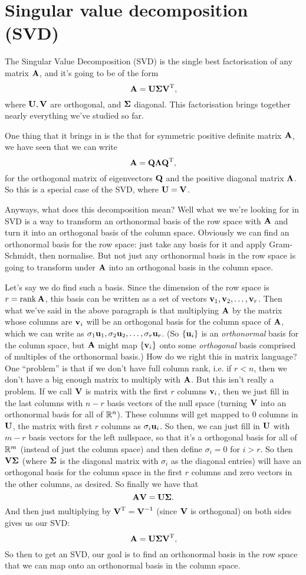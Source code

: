 \section{Singular value decomposition (SVD)}

The Singular Value Decomposition (SVD) is the single best factorisation of any matrix $\boldsymbol{\mathbf{A}}$, and it's going to be of the form
\[ \boldsymbol{\mathbf{A}} = \boldsymbol{\mathbf{U}} \boldsymbol{\mathbf{\Sigma}} \boldsymbol{\mathbf{V}}^\mathrm{T}, \]
where $\boldsymbol{\mathbf{U}},\boldsymbol{\mathbf{V}}$ are orthogonal, and $\boldsymbol{\mathbf{\Sigma}}$ diagonal. This factorisation brings together nearly everything we've studied so far.

One thing that it brings in is the that for symmetric positive definite matrix $\boldsymbol{\mathbf{A}}$, we have seen that we can write
\[ \boldsymbol{\mathbf{A}} = \boldsymbol{\mathbf{Q}} \boldsymbol{\mathbf{\Lambda}} \boldsymbol{\mathbf{Q}}^\mathrm{T}, \]
for the orthogonal matrix of eigenvectors $\boldsymbol{\mathbf{Q}}$ and the positive diagonal matrix $\boldsymbol{\mathbf{\Lambda}}$. So this is a special case of the SVD, where $\boldsymbol{\mathbf{U}} = \boldsymbol{\mathbf{V}}$.

Anyways, what does this decomposition mean? Well what we we're looking for in SVD is a way to transform an orthonormal basis of the row space with $\boldsymbol{\mathbf{A}}$ and turn it into an orthogonal basis of the column space. Obviously we can find an orthonormal basis for the row space: just take any basis for it and apply Gram-Schmidt, then normalise. But not just any orthonormal basis in the row space is going to transform under $\boldsymbol{\mathbf{A}}$ into an orthogonal basis in the column space.

Let's say we do find such a basis. Since the dimension of the row space is $r = \mathrm{rank}\, \boldsymbol{\mathbf{A}}$, this basis can be written as a set of vectors $\boldsymbol{\mathbf{v}}_1, \boldsymbol{\mathbf{v}}_2, \ldots, \boldsymbol{\mathbf{v}}_r$. Then what we've said in the above paragraph is that multiplying $\boldsymbol{\mathbf{A}}$ by the matrix whose columns are $\boldsymbol{\mathbf{v}}_i$ will be an orthogonal basis for the column space of $\boldsymbol{\mathbf{A}}$, which we can write as $\sigma_1 \boldsymbol{\mathbf{u}}_1, \sigma_2 \boldsymbol{\mathbf{u}}_2, \ldots, \sigma_r \boldsymbol{\mathbf{u}}_r$. (So $\{\boldsymbol{\mathbf{u}}_i\}$ is an \textit{orthonormal} basis for the column space, but $\boldsymbol{\mathbf{A}}$ might map $\{\boldsymbol{\mathbf{v}}_i\}$ onto some \textit{orthogonal} basis comprised of multiples of the orthonormal basis.) How do we right this in matrix language? One ``problem'' is that if we don't have full column rank, i.e. if $r < n$, then we don't have a big enough matrix to multiply with $\boldsymbol{\mathbf{A}}$. But this isn't really a problem. If we call $\boldsymbol{\mathbf{V}}$ is matrix with the first $r$ columns $\boldsymbol{\mathbf{v}}_i$, then we just fill in the last columns with $n-r$ basis vectors of the null space (turning $\boldsymbol{\mathbf{V}}$ into an orthonormal basis for all of $\mathbb{R}^n$). These columns will get mapped to 0 columns in $\boldsymbol{\mathbf{U}}$, the matrix with first $r$ columns as $\sigma_i\boldsymbol{\mathbf{u}}_i$. So then, we can just fill in $\boldsymbol{\mathbf{U}}$ with $m-r$ basis vectors for the left nullspace, so that it's a orthogonal basis for all of $\mathbb{R}^m$ (instead of just the column space) and then define $\sigma_i = 0$ for $i > r$. So then $\boldsymbol{\mathbf{V}}\boldsymbol{\mathbf{\Sigma}}$ (where $\boldsymbol{\mathbf{\Sigma}}$ is the diagonal matrix with $\sigma_i$ as the diagonal entries) will have an orthogonal basis for the column space in the first $r$ columns and zero vectors in the other columns, as desired. So finally we have that
\[ \boldsymbol{\mathbf{A}}\boldsymbol{\mathbf{V}} = \boldsymbol{\mathbf{U}}\boldsymbol{\mathbf{\Sigma}}. \]
And then just multiplying by $\boldsymbol{\mathbf{V}}^\mathrm{T} = \boldsymbol{\mathbf{V}}^{-1}$ (since $\boldsymbol{\mathbf{V}}$ is orthogonal) on both sides gives us our SVD:
\[ \boldsymbol{\mathbf{A}} = \boldsymbol{\mathbf{U}} \boldsymbol{\mathbf{\Sigma}} \boldsymbol{\mathbf{V}}^\mathrm{T}, \]
So then to get an SVD, our goal is to find an orthonormal basis in the row space that we can map onto an orthonormal basis in the column space.

